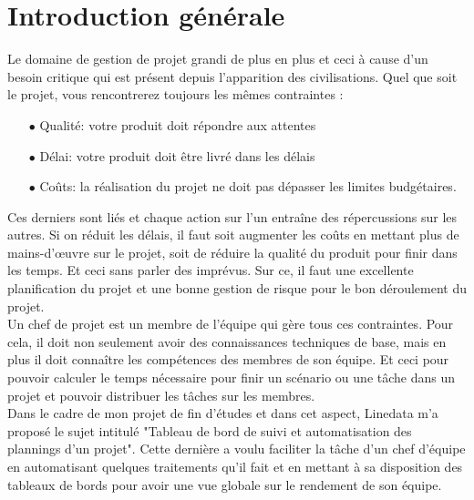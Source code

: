 \chapter*{Introduction générale}
Le domaine de gestion de projet grandi de plus en plus et ceci à cause d'un besoin critique qui est présent depuis l'apparition des civilisations. Quel que soit le projet, vous rencontrerez toujours les mêmes contraintes :\\
\begin{itemize}
    \item[$\bullet$] Qualité: votre produit doit répondre aux attentes
    \item[$\bullet$] Délai: votre produit doit être livré dans les délais
    \item[$\bullet$] Coûts: la réalisation du projet ne doit pas dépasser les limites budgétaires.\\
\end{itemize}

Ces derniers sont liés et chaque action sur l'un entraîne des répercussions sur les autres. Si on réduit les délais, il faut soit augmenter les coûts en mettant plus de mains-d'œuvre sur le projet, soit de réduire la qualité du produit pour finir dans les temps. Et ceci sans parler des imprévus. Sur ce, il faut une excellente planification du projet et une bonne gestion de risque pour le bon déroulement du projet.\\

Un chef de projet est un membre de l'équipe qui gère tous ces contraintes. Pour cela, il doit non seulement avoir des connaissances techniques de base, mais en plus il doit connaître les compétences des membres de son équipe. Et ceci pour pouvoir calculer le temps nécessaire pour finir un scénario ou une tâche dans un projet et pouvoir distribuer les tâches sur les membres.\\

Dans le cadre de mon projet de fin d'études et dans cet aspect, Linedata m'a proposé le sujet intitulé "Tableau de bord de suivi et automatisation des plannings d'un projet". Cette dernière a voulu faciliter la tâche d'un chef d'équipe en automatisant quelques traitements qu'il fait et en mettant à sa disposition des tableaux de bords pour avoir une vue globale sur le rendement de son équipe.\\


